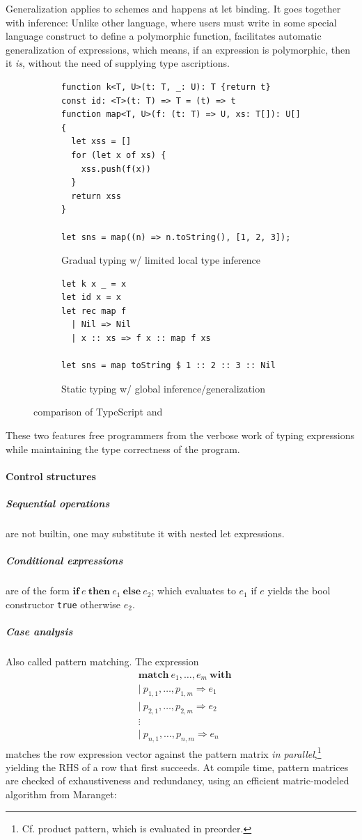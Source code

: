 \documentclass[a4paper, 11pt]{article}
\theoremstyle{remark}\newtheorem*{remark}{Remark}
\theoremstyle{definition}\newtheorem*{definition}{Definition}
\begin{document}
Generalization applies to schemes and happens at let binding. It goes together with inference:
Unlike other language, where users must write in some special language construct to define a
polymorphic function, \Tigris facilitates automatic generalization of expressions, which means,
if an expression is polymorphic, then it \emph{is},
without the need of supplying type ascriptions.

\begin{figure}\centering
  \begin{subfigure}{0.6\textwidth}\centering
    \begin{verbatim}
function k<T, U>(t: T, _: U): T {return t}
const id: <T>(t: T) => T = (t) => t
function map<T, U>(f: (t: T) => U, xs: T[]): U[] {
  let xss = []
  for (let x of xs) {
    xss.push(f(x))
  }
  return xss
}

let sns = map((n) => n.toString(), [1, 2, 3]);
    \end{verbatim}
    \caption{Gradual typing w/ limited local type inference}
  \end{subfigure}%
  \begin{subfigure}{0.5\textwidth}\centering
    \begin{verbatim}
let k x _ = x
let id x = x
let rec map f
  | Nil => Nil
  | x :: xs => f x :: map f xs

let sns = map toString $ 1 :: 2 :: 3 :: Nil
    \end{verbatim}
    \caption{Static typing w/ global inference/generalization}
  \end{subfigure}
  \caption{comparison of TypeScript and \Tigris}\label{code:ts-tig}
\end{figure}

These two features free programmers from the verbose work of typing expressions while maintaining
the type correctness of the program.

\paragraph{Control structures}
\subparagraph{Sequential operations} are not builtin, one may substitute it with nested let expressions.
\subparagraph{Conditional expressions} are of the form
\(\mathbf{if}\ e\ \mathbf{then}\ e_1\ \mathbf{else}\ e_2\); which evaluates to \(e_1\) if \(e\) yields the bool
constructor \texttt{true} otherwise \(e_2\).
\subparagraph{Case analysis} Also called pattern matching. The expression
\begin{align*}
  &\mathbf{match}\ e_1,\dots, e_m\ \mathbf{with}\\
  &\vert\ p_{1,1},\dots,p_{1,m}\Rightarrow e_1 \\
  &\vert\ p_{2,1},\dots,p_{2,m}\Rightarrow e_{2}\\
  &\vdots\\
  &\vert\ p_{n,1},\dots,p_{n,m}\Rightarrow e_{n}
\end{align*}
matches the row expression vector against the pattern matrix
\emph{in parallel},\footnote{Cf. product pattern, which is evaluated in preorder.}
yielding the RHS of a row that first succeeds.
At compile time, pattern matrices are checked of exhaustiveness and redundancy, using an
efficient matric-modeled algorithm from Maranget:
\end{document}
